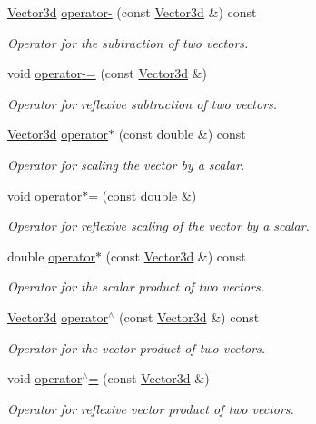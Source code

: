 \begin{DoxyCompactItemize}
\hyperlink{classVector3d}{\-Vector3d} \hyperlink{classVector3d_a727932bfb1f230c8f256e10a0d45a8c7}{operator-\/} (const \hyperlink{classVector3d}{\-Vector3d} \&) const 
\begin{DoxyCompactList}\small\item\em \-Operator for the subtraction of two vectors. \end{DoxyCompactList}\item 
void \hyperlink{classVector3d_a14d45e123683a1f1a2ba32d43083fcd7}{operator-\/=} (const \hyperlink{classVector3d}{\-Vector3d} \&)
\begin{DoxyCompactList}\small\item\em \-Operator for reflexive subtraction of two vectors. \end{DoxyCompactList}\item 
\hyperlink{classVector3d}{\-Vector3d} \hyperlink{classVector3d_a656a4a90ae5619c4deb7851da2aaa2e8}{operator$\ast$} (const double \&) const 
\begin{DoxyCompactList}\small\item\em \-Operator for scaling the vector by a scalar. \end{DoxyCompactList}\item 
void \hyperlink{classVector3d_a3014b4a7a5feded758421dfb7df4daa2}{operator$\ast$=} (const double \&)
\begin{DoxyCompactList}\small\item\em \-Operator for reflexive scaling of the vector by a scalar. \end{DoxyCompactList}\item 
double \hyperlink{classVector3d_a43b3a3d87cedd5a88539d030a8853590}{operator$\ast$} (const \hyperlink{classVector3d}{\-Vector3d} \&) const 
\begin{DoxyCompactList}\small\item\em \-Operator for the scalar product of two vectors. \end{DoxyCompactList}\item 
\hyperlink{classVector3d}{\-Vector3d} \hyperlink{classVector3d_a3a8254737a895334fc887d98e8446298}{operator$^\wedge$} (const \hyperlink{classVector3d}{\-Vector3d} \&) const 
\begin{DoxyCompactList}\small\item\em \-Operator for the vector product of two vectors. \end{DoxyCompactList}\item 
void \hyperlink{classVector3d_a868e89192951f4a25f63b958ec419f6f}{operator$^\wedge$=} (const \hyperlink{classVector3d}{\-Vector3d} \&)
\begin{DoxyCompactList}\small\item\em \-Operator for reflexive vector product of two vectors. \end{DoxyCompactList}\end{DoxyCompactItemize}
